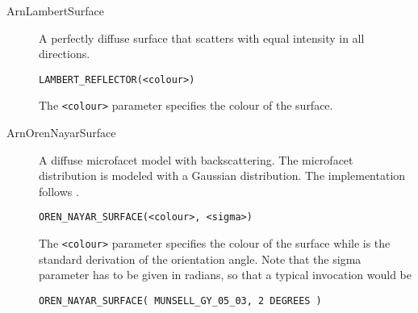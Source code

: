\begin{description}

\item[ArnLambertSurface] A perfectly diffuse surface that scatters with equal intensity in all directions.
\begin{verbatim}
LAMBERT_REFLECTOR(<colour>)
\end{verbatim}
The \texttt{<colour>} parameter specifies the colour of the surface. 
\item[ArnOrenNayarSurface] A diffuse microfacet model with backscattering. The microfacet distribution is modeled with a Gaussian distribution. The implementation follows \cite{conf/siggraph/OrenN94}.
\begin{verbatim}
OREN_NAYAR_SURFACE(<colour>, <sigma>)
\end{verbatim}
The \texttt{<colour>} parameter specifies the colour of the surface while  is the standard derivation of the orientation angle.  Note that the sigma parameter has to be given in radians, so that a typical invocation would \eg be

\begin{verbatim}
OREN_NAYAR_SURFACE( MUNSELL_GY_05_03, 2 DEGREES )
\end{verbatim}


\end{description}

